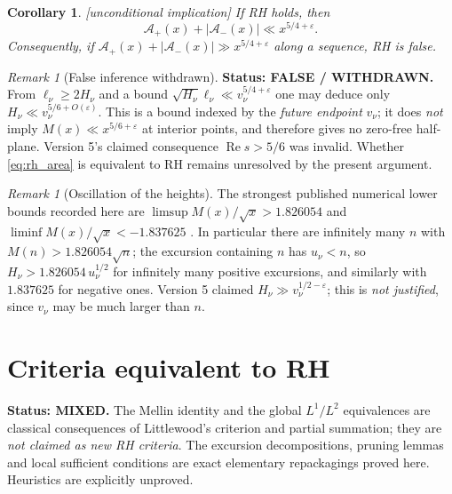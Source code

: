\documentclass[11pt]{amsart}
\numberwithin{equation}{section}
\theoremstyle{plain}
\newtheorem{corollary}[theorem]{Corollary}
\theoremstyle{definition}
\theoremstyle{remark}
\newtheorem{remark}[theorem]{Remark}
\newcommand{\Ap}{\mathcal{A}_{+}}
\newcommand{\Am}{\mathcal{A}_{-}}
\newcommand{\eps}{\varepsilon}
\begin{document}
\begin{corollary}
\label{cor:rh}
\emph{[unconditional implication]} If RH holds, then
\begin{equation}
\label{eq:rh_area}
  \Ap(x)+|\Am(x)|\ll x^{5/4+\eps}.
\end{equation}
Consequently, if $\Ap(x)+|\Am(x)|\gg x^{5/4+\eps}$ along a sequence, RH is
false.
\end{corollary}

\begin{remark}[False inference withdrawn]
\label{rem:onedirection}
\textbf{Status: FALSE / WITHDRAWN.} From $\ell_\nu\ge2H_\nu$ and a bound
$\sqrt{H_\nu}\ell_\nu\ll v_\nu^{5/4+\eps}$ one may deduce only
$H_\nu\ll v_\nu^{5/6+O(\eps)}$. This is a bound indexed by the
\emph{future endpoint} $v_\nu$; it does \emph{not} imply
$M(x)\ll x^{5/6+\eps}$ at interior points, and therefore gives no
zero-free half-plane. Version 5's claimed consequence
$\operatorname{Re}s>5/6$ was invalid. Whether \eqref{eq:rh_area} is
equivalent to RH remains unresolved by the present argument.
\end{remark}

\begin{remark}[Oscillation of the heights]
\label{rem:omega}
The strongest published numerical lower bounds recorded here are
$\limsup M(x)/\sqrt{x}>1.826054$ and
$\liminf M(x)/\sqrt{x}<-1.837625$ \cite{Hurst18}. In particular there are
infinitely many $n$ with $M(n)>1.826054\sqrt n$; the excursion containing $n$
has $u_\nu<n$, so $H_\nu>1.826054\,u_\nu^{1/2}$ for infinitely many
positive excursions, and similarly with $1.837625$ for negative ones. Version 5 claimed
$H_\nu\gg v_\nu^{1/2-\eps}$; this is \emph{not justified}, since $v_\nu$
may be much larger than $n$.
\end{remark}

\section{Criteria equivalent to RH}
\label{sec:criteria}

\noindent\textbf{Status: MIXED.} The Mellin identity and the global
$L^1/L^2$ equivalences are classical consequences of Littlewood's criterion
and partial summation; they are \emph{not claimed as new RH criteria}. The
excursion decompositions, pruning lemmas and local sufficient conditions are
exact elementary repackagings proved here. Heuristics are explicitly
unproved.

\medskip
\end{document}
